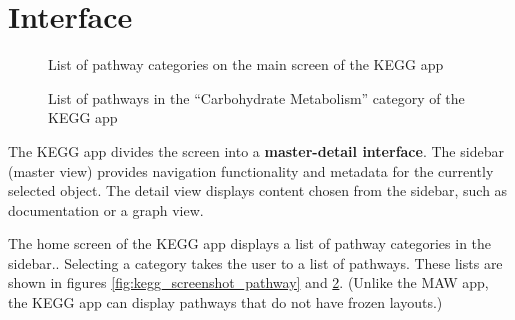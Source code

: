 \section{Interface}
\label{sect:kegg_interface}

\begin{figure}
    \caption{\label{fig:kegg_screenshot_list} List of pathway categories on
    the main screen of the KEGG app}
\end{figure}

\begin{figure}
    \caption{\label{fig:kegg_screenshot_sublist} List of pathways in the
    ``Carbohydrate Metabolism'' category of the KEGG app}
\end{figure}

The KEGG app divides the screen into a \textbf{master-detail interface}. The
sidebar (master view) provides navigation functionality and metadata for the
currently selected object. The detail view displays content chosen from the
sidebar, such as documentation or a graph view.

The home screen of the KEGG app displays a list of pathway categories in the
sidebar.. Selecting a category takes the user to a list of pathways. These lists
are shown in figures \ref{fig:kegg_screenshot_pathway} and
\ref{fig:kegg_screenshot_sublist}.  (Unlike the MAW app, the KEGG app can
display pathways that do not have frozen layouts.)


